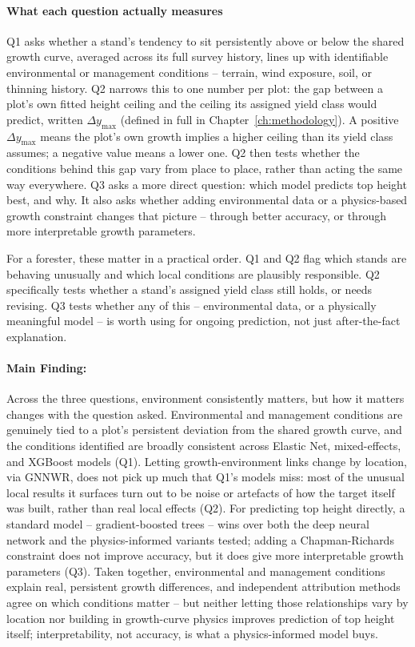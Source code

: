 \paragraph*{What each question actually measures}
Q1 asks whether a stand's tendency to sit persistently above or below the shared growth curve, averaged across its full survey history, lines up with identifiable environmental or management conditions -- terrain, wind exposure, soil, or thinning history. Q2 narrows this to one number per plot: the gap between a plot's own fitted height ceiling and the ceiling its assigned yield class would predict, written $\Delta y_{\max}$ (defined in full in Chapter~\ref{ch:methodology}). A positive $\Delta y_{\max}$ means the plot's own growth implies a higher ceiling than its yield class assumes; a negative value means a lower one. Q2 then tests whether the conditions behind this gap vary from place to place, rather than acting the same way everywhere. Q3 asks a more direct question: which model predicts top height best, and why. It also asks whether adding environmental data or a physics-based growth constraint changes that picture -- through better accuracy, or through more interpretable growth parameters.

For a forester, these matter in a practical order. Q1 and Q2 flag which stands are behaving unusually and which local conditions are plausibly responsible. Q2 specifically tests whether a stand's assigned yield class still holds, or needs revising. Q3 tests whether any of this -- environmental data, or a physically meaningful model -- is worth using for ongoing prediction, not just after-the-fact explanation.

\paragraph*{Main Finding:}
Across the three questions, environment consistently matters, but how it matters changes with the question asked. Environmental and management conditions are genuinely tied to a plot's persistent deviation from the shared growth curve, and the conditions identified are broadly consistent across Elastic Net, mixed-effects, and XGBoost models (Q1). Letting growth-environment links change by location, via GNNWR, does not pick up much that Q1's models miss: most of the unusual local results it surfaces turn out to be noise or artefacts of how the target itself was built, rather than real local effects (Q2). For predicting top height directly, a standard model -- gradient-boosted trees -- wins over both the deep neural network and the physics-informed variants tested; adding a Chapman-Richards constraint does not improve accuracy, but it does give more interpretable growth parameters (Q3). Taken together, environmental and management conditions explain real, persistent growth differences, and independent attribution methods agree on which conditions matter -- but neither letting those relationships vary by location nor building in growth-curve physics improves prediction of top height itself; interpretability, not accuracy, is what a physics-informed model buys.
